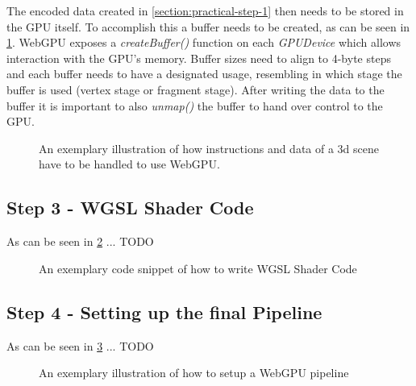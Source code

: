 The encoded data created in \ref*{section:practical-step-1} then needs to be stored in the GPU itself. To accomplish this a buffer needs to be created, as can be seen in \ref*{code:create-buffer}. 
WebGPU exposes a \emph{createBuffer()} function on each \emph{GPUDevice} which allows interaction with the GPU's memory. Buffer sizes need to align to 4-byte steps and each buffer needs to 
have a designated usage, resembling in which stage the buffer is used (vertex stage or fragment stage). After writing the data to the buffer it is important to also \emph{unmap()} the buffer 
to hand over control to the GPU. 

\begin{figure}[tp]
  \centering

  \caption[Code Snippet: createBuffer]
  {
    An exemplary illustration of how instructions and data of a 3d scene have to be handled
    to use WebGPU.
  }
  \label{code:create-buffer}
\end{figure}


\subsection{Step 3 - WGSL Shader Code}

As can be seen in \ref*{code:shader-code} ... TODO


\begin{figure}[tp]

  \centering

  \caption[Code Snippet: WebGPU Shader Code]
  {
    An exemplary code snippet of how to write WGSL Shader Code
  }
  \label{code:shader-code}
\end{figure}

\subsection{Step 4 - Setting up the final Pipeline}

As can be seen in \ref*{code:pipeline-setup} ... TODO


\begin{figure}[tp]

  \centering

  \caption[Code Snippet: WebGPU Pipeline]
  {
    An exemplary illustration of how to setup a WebGPU pipeline
  }
  \label{code:pipeline-setup}
\end{figure}

